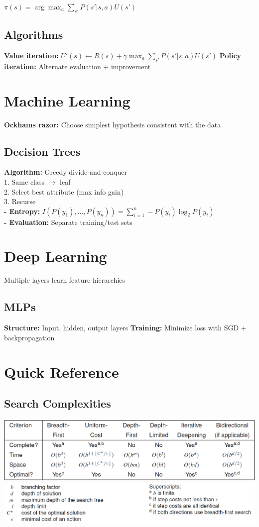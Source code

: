 \documentclass[8pt,landscape,a4paper]{article}
\begin{document}
\begin{multicols*}{3}
$\pi(s) = \arg\max_a \sum_{s'} P(s'|s,a)U(s')$

\subsection{Algorithms}
\textbf{Value iteration:} $U'(s) \leftarrow R(s) + \gamma \max_a \sum_{s'} P(s'|s,a)U(s')$
\textbf{Policy iteration:} Alternate evaluation + improvement

\section{Machine Learning}
\textbf{Ockhams razor:} Choose simplest hypothesis consistent with the data

\subsection{Decision Trees}
\textbf{Algorithm:} Greedy divide-and-conquer\\
1. Same class $\rightarrow$ leaf\\
2. Select best attribute (max info gain)\\
3. Recurse\\
\textbf{ - Entropy:} $I(P(y_1),\ldots,P(y_n)) = \sum_{i=1}^n -P(y_i)\log_2 P(y_i)$\\
\textbf{ - Evaluation:} Separate training/test sets

\section{Deep Learning}
Multiple layers learn feature hierarchies

\subsection{MLPs}
\textbf{Structure:} Input, hidden, output layers
\textbf{Training:} Minimize loss with SGD + backpropagation

\columnbreak

\section{Quick Reference}

\subsection{Search Complexities}

\includegraphics[width=\columnwidth]{searches1.png}
\includegraphics[width=\columnwidth]{searches2.png}


\end{multicols*}
\end{document}
